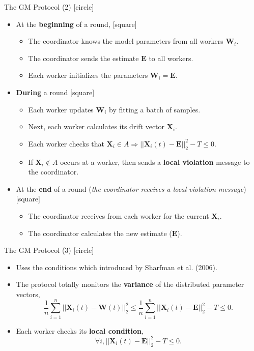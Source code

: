 \begin{frame}{The GM Protocol (2)}
    [circle]
    \begin{itemize}
        \item{At the \textbf{beginning} of a round,
        [square]
        \begin{itemize}
            \item{The coordinator knows the model parameters from all workers $\pmb{W}_i$.}
            \item{The coordinator sends the estimate $\pmb{E}$ to all workers.}
            \item{Each worker initializes the parameters $\pmb{W}_i=\pmb{E}$.}
        \end{itemize}}
        \item{\textbf{During} a round
        [square]
        \begin{itemize}
            \item{Each worker updates $\pmb{W}_i$ by fitting a batch of samples.}
            \item{Next, each worker calculates its drift vector $\pmb{X}_i$.}
            \item{Each worker checks that $\pmb{X}_i\in A\Rightarrow||\pmb{X}_i(t)-\pmb{E}||_2^2 - T \leq 0$.}
            \item{If $\pmb{X}_i\not\in A$ occurs at a worker, then sends a \textbf{local violation} message to the coordinator.}
        \end{itemize}}
        \item{At the \textbf{end} of a round (\emph{the coordinator receives a local violation message})
        [square]
        \begin{itemize}
            \item{The coordinator receives from each worker for the current $\pmb{X}_i$.}
            \item{The coordinator calculates the new estimate ($\pmb{E}$).}
        \end{itemize}}
    \end{itemize}
\end{frame}

\begin{frame}{The GM Protocol (3)}
    [circle]
    \begin{itemize}
        \item{Uses the conditions which introduced by Sharfman et al. (2006).}
        \vspace{0.4cm}
        \item{The protocol totally monitors the \textbf{variance} of the distributed parameter vectors,
        \[\frac{1}{n}\sum_{i=1}^n||\pmb{X}_i(t)-\pmb{W}(t)||_2^2 \leq \frac{1}{n}\sum_{i=1}^n||\pmb{X}_i(t)-\pmb{E}||_2^2 - T \leq 0.\]}
        \vspace{-0.4cm}
        \item{Each worker checks its \textbf{local condition},
        \[\forall i,||\pmb{X}_i(t)-\pmb{E}||_2^2 - T \leq 0.\]}
    \end{itemize}
\end{frame}